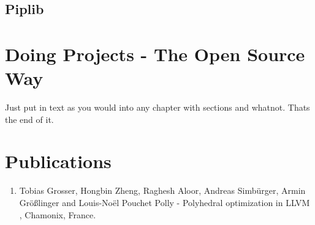\documentclass[MTech]{iitmdiss}
\begin{document}
\section{Piplib}

\chapter{Doing Projects - The Open Source Way}
 
 Just put in text as you would into any chapter with sections and
 whatnot.  Thats the end of it.


\chapter*{Publications}
\vspace{-0.3cm}

\begin{enumerate}
\item Tobias Grosser, Hongbin Zheng, Raghesh Aloor, Andreas Simb{\"u}rger, Armin {G}r{\"o}{\ss}linger and Louis-No{\"e}l Pouchet \newblock
  Polly - Polyhedral optimization in LLVM , Chamonix, France.
\end{enumerate}


\pagebreak
\begin{singlespace}
  \begin{small}
	
%
  \end{small}
\end{singlespace}

\end{document}
